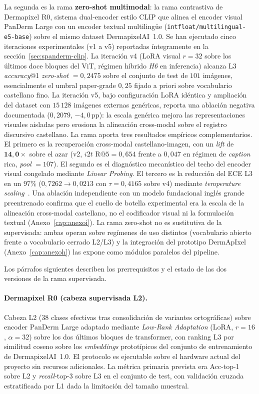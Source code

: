 La segunda es la rama \textbf{zero-shot multimodal}:
la rama contrastiva de Dermapixel R0, sistema dual-encoder estilo CLIP que alinea el
encoder visual PanDerm Large con un encoder textual multilingüe
(\texttt{intfloat/multilingual-e5-base}) sobre el mismo dataset
DermapixelAI~1.0. Se han ejecutado cinco iteraciones
experimentales (v1 a v5) reportadas íntegramente en la
sección~\ref{sec:spanderm-clip}. La iteración v4
($\text{LoRA}$ visual $r=32$ sobre los últimos doce bloques del
ViT, régimen híbrido \emph{H6} en inferencia) alcanza L3
\emph{accuracy}@1 \emph{zero-shot} $= 0{,}2475$ sobre el conjunto
de test de $101$ imágenes, esencialmente el umbral paper-grade
$0{,}25$ fijado a priori sobre vocabulario castellano fino. La
iteración v5, bajo configuración LoRA idéntica y ampliación del
dataset con $15\,128$ imágenes externas genéricas, reporta una
ablación negativa documentada ($0{,}2079$, $-4{,}0$\,pp): la
escala genérica mejora las representaciones visuales aisladas
pero erosiona la alineación cross-modal sobre el registro
discursivo castellano. La rama aporta tres resultados empíricos
complementarios. El primero es la recuperación cross-modal
castellano-imagen, con un \emph{lift} de $\mathbf{14{,}0\times}$
sobre el azar (v2, $i2t$ R@$5 = 0{,}654$ frente a $0{,}047$ en
régimen de \emph{caption} rica, \emph{pool} $= 107$). El segundo
es el diagnóstico mecanístico del techo del encoder visual
congelado mediante \emph{Linear Probing}. El tercero es la
reducción del ECE L3 en un $97\%$
($0{,}7262 \to 0{,}0213$ con $\tau = 0{,}4165$ sobre v4) mediante
\emph{temperature scaling}~\cite{guo2017}. Una ablación
independiente con un modelo fundacional inglés grande preentrenado
confirma que el cuello de botella experimental era la escala de la
alineación cross-modal castellano, no el codificador visual ni la
formulación textual (Anexo~\ref{cap:anexoi}). La rama zero-shot no es sustitutiva de
la supervisada: ambas operan sobre regímenes de uso distintos
(vocabulario abierto frente a vocabulario cerrado L2/L3) y la
integración del prototipo DermApIxel (Anexo~\ref{cap:anexoh})
las expone como módulos paralelos del pipeline.

Los párrafos siguientes describen los prerrequisitos y el estado
de las dos versiones de la rama supervisada.

\paragraph{Dermapixel R0 (cabeza supervisada L2).}
Cabeza L2 ($38$ clases efectivas tras consolidación de
variantes ortográficas) sobre encoder PanDerm Large adaptado
mediante \emph{Low-Rank Adaptation} (LoRA, $r=16$, $\alpha=32$)
sobre los dos últimos bloques de transformer, con ranking L3 por
similitud coseno sobre los \emph{embeddings} prototípicos del
conjunto de entrenamiento de DermapixelAI~1.0. El protocolo es
ejecutable sobre el hardware actual del proyecto sin recursos
adicionales. La métrica primaria prevista era Acc-top-1 sobre L2
y \emph{recall}-top-3 sobre L3 en el conjunto de test, con
validación cruzada estratificada por L1 dada la limitación del
tamaño muestral.

